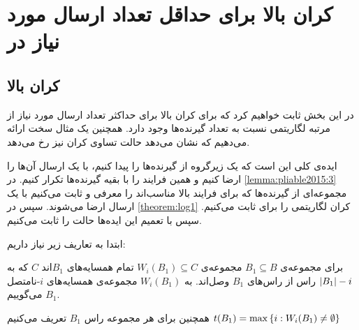 \section{کران بالا برای حداقل تعداد ارسال مورد نیاز در
\picod}

\subsection{کران بالا}
در این بخش ثابت خواهیم کرد که برای
\picodt
کران بالا برای حداکثر تعداد ارسال مورد نیاز از مرتبه لگاریتمی نسبت به تعداد گیرنده‌ها وجود دارد. همچنین یک مثال سخت ارائه می‌دهیم که نشان می‌دهد حالت تساوی کران نیز رخ می‌دهد.

ایده‌ی کلی این است که یک زیرگروه از گیرنده‌ها را پیدا کنیم، با یک ارسال آن‌ها را ارضا کنیم و همین فرایند را با بقیه گیرنده‌ها تکرار کنیم. در
\autoref{lemma:pliable2015:3}
مجموعه‌ای از گیرنده‌ها که برای فرایند بالا مناسب‌اند را معرفی و ثابت می‌کنیم با یک ارسال ارضا می‌شوند. سپس در
\autoref{theorem:log1}
کران لگاریتمی را برای
ثابت می‌کنیم. سپس با تعمیم این ایده‌ها حالت
را ثابت می‌کنیم.

ابتدا به تعاریف زیر نیاز داریم:
\begin{definition}
    \label{def:nonnei}
    برای مجموعه‌ی
    $B_1 \subseteq B$
    مجموعه‌ی
    $W_i(B_1) \subseteq C$
    تمام همسایه‌های
    $B_1$اند
    $C$
    که به
    $\left|{B_1}\right| - i$
    راس از راس‌های
    $B_1$
    وصل‌اند. به
    $W_i(B_1)$
    مجموعه‌ی همسایه‌های
    $i$-نامتصل
    $B_1$
    می‌گوییم.

    همچنین برای هر مجموعه‌ راس
    $B_1$
    تعریف می‌کنیم
    $t(B_1) = \max\left\{ i: W_i(B_1) \neq \emptyset  \right\}$
\end{definition}

